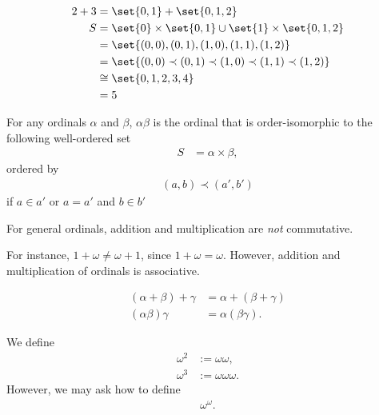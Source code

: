 \documentclass[10pt]{mypackage}
\begin{document}
\begin{example}
  \begin{align*}
    2 + 3 &= \set{0,1} + \set{0,1,2}\\
    S &= \set{0}\times\set{0,1} \cup \set{1}\times \set{0,1,2}\\
      &= \set{(0,0),(0,1),(1,0),(1,1),(1,2)}\\
      &= \set{(0,0)\prec (0,1) \prec(1,0) \prec( 1,1) \prec(1,2)}\\
      &\cong \set{0,1,2,3,4}\\
      &= 5
  \end{align*}
\end{example}
\begin{definition}[Multiplication]
  For any ordinals $\alpha$ and $\beta$, $\alpha \beta$ is the ordinal that is order-isomorphic to the following well-ordered set
  \begin{align*}
    S &= \alpha \times \beta,
  \end{align*}
  ordered by
  \begin{align*}
    (a,b) \prec (a',b')
  \end{align*}
  if $a \in a'$ or $a = a'$ and $b\in b'$
\end{definition}
\begin{remark}
  For general ordinals, addition and multiplication are \textit{not} commutative.\newline

  For instance, $1 + \omega \neq \omega + 1$, since $ 1 + \omega = \omega$. However, addition and multiplication of ordinals is associative.
\end{remark}
\begin{theorem}
  \begin{align*}
    \left(\alpha + \beta\right) + \gamma &= \alpha + \left(\beta + \gamma\right)\\
    \left(\alpha \beta\right)\gamma &= \alpha\left(\beta \gamma\right).
  \end{align*}
\end{theorem}
\begin{remark}
  We define
  \begin{align*}
    \omega^{2} &:= \omega \omega,\\
    \omega^{3} &:= \omega \omega \omega.
  \end{align*}
  However, we may ask how to define
  \begin{align*}
    \omega^{\omega}.
  \end{align*}
\end{remark}
\end{document}
